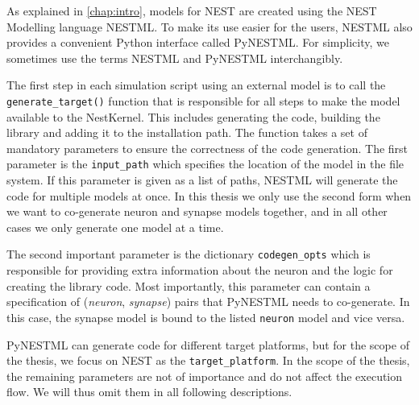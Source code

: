 As explained in \autoref{chap:intro}, models for NEST are created using the NEST Modelling language NESTML. To make its use easier for the users, NESTML also provides a convenient Python interface called PyNESTML. For simplicity, we sometimes use the terms NESTML and PyNESTML interchangibly.

The first step in each simulation script using an external model is to call the \texttt{generate\_target()} function that is responsible for all steps to make the model available to the NestKernel. This includes generating the code, building the library and adding it to the installation path. The function takes a set of mandatory parameters to ensure the correctness of the code generation. The first parameter is the \texttt{input\_path} which specifies the location of the model in the file system. If this parameter is given as a list of paths, NESTML will generate the code for multiple models at once. In this thesis we only use the second form when we want to co-generate neuron and synapse models together, and in all other cases we only generate one model at a time.

The second important parameter is the dictionary \texttt{codegen\_opts} which is responsible for providing extra information about the neuron and the logic for creating the library code. Most importantly, this parameter can contain a specification of (\emph{neuron}, \emph{synapse}) pairs that PyNESTML needs to co-generate. In this case, the synapse model is bound to the listed \texttt{neuron} model and vice versa.

PyNESTML can generate code for different target platforms, but for the scope of the thesis, we focus on NEST as the \texttt{target\_platform}. In the scope of the thesis, the remaining parameters are not of importance and do not affect the execution flow. We will thus omit them in all following descriptions.

